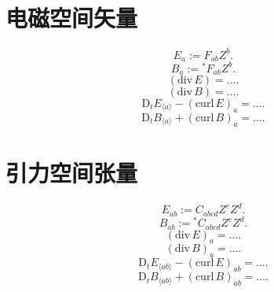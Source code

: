 \section{电磁空间矢量}

\begin{equation}
    E_a:=F_{ab}Z^b.
\end{equation}
\begin{equation}
    B_a:={}^*\!F_{ab}Z^b.
\end{equation}
\begin{equation}
    (\text{div}\,E)=\dots.
\end{equation}
\begin{equation}
    (\text{div}\,B)=\dots.
\end{equation}
\begin{equation}
    \text{D}_t E_{\langle a\rangle}-(\text{curl}\,E)_a=\dots.
\end{equation}
\begin{equation}
    \text{D}_t B_{\langle a\rangle}+(\text{curl}\,B)_a=\dots.
\end{equation}

\section{引力空间张量}

\begin{equation}
    E_{ab}:=C_{abcd}Z^cZ^d.
\end{equation}
\begin{equation}
    B_{ab}:={}^*\!C_{abcd}Z^cZ^d.
\end{equation}
\begin{equation}
    (\text{div}\,E)_a=\dots.
\end{equation}
\begin{equation}
    (\text{div}\,B)_a=\dots.
\end{equation}
\begin{equation}
    \text{D}_t E_{\langle ab\rangle}-(\text{curl}\,E)_{ab}=\dots.
\end{equation}
\begin{equation}
    \text{D}_t B_{\langle ab\rangle}+(\text{curl}\,B)_{ab}=\dots.
\end{equation}
